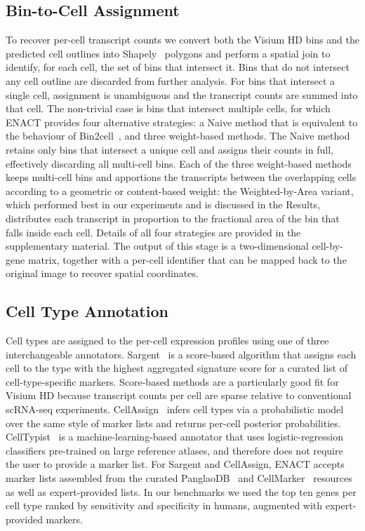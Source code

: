 \documentclass[11pt]{article}
\begin{document}
\subsection{Bin-to-Cell Assignment}

To recover per-cell transcript counts we convert both the Visium HD bins and the predicted cell outlines into Shapely~\cite{shapely2007gillies} polygons and perform a spatial join to identify, for each cell, the set of bins that intersect it. Bins that do not intersect any cell outline are discarded from further analysis. For bins that intersect a single cell, assignment is unambiguous and the transcript counts are summed into that cell. The non-trivial case is bins that intersect multiple cells, for which ENACT provides four alternative strategies: a Naive method that is equivalent to the behaviour of Bin2cell~\cite{polacco2024bin2cell}, and three weight-based methods. The Naive method retains only bins that intersect a unique cell and assigns their counts in full, effectively discarding all multi-cell bins. Each of the three weight-based methods keeps multi-cell bins and apportions the transcripts between the overlapping cells according to a geometric or content-based weight: the Weighted-by-Area variant, which performed best in our experiments and is discussed in the Results, distributes each transcript in proportion to the fractional area of the bin that falls inside each cell. Details of all four strategies are provided in the supplementary material. The output of this stage is a two-dimensional cell-by-gene matrix, together with a per-cell identifier that can be mapped back to the original image to recover spatial coordinates.

\subsection{Cell Type Annotation}

Cell types are assigned to the per-cell expression profiles using one of three interchangeable annotators. Sargent~\cite{nouri2024sargent} is a score-based algorithm that assigns each cell to the type with the highest aggregated signature score for a curated list of cell-type-specific markers. Score-based methods are a particularly good fit for Visium HD because transcript counts per cell are sparse relative to conventional scRNA-seq experiments. CellAssign~\cite{zhang2019probabilistic} infers cell types via a probabilistic model over the same style of marker lists and returns per-cell posterior probabilities. CellTypist~\cite{conde2022celltypist} is a machine-learning-based annotator that uses logistic-regression classifiers pre-trained on large reference atlases, and therefore does not require the user to provide a marker list. For Sargent and CellAssign, ENACT accepts marker lists assembled from the curated PanglaoDB~\cite{franzen2019panglaodb} and CellMarker~\cite{zhang2019cellmarker} resources as well as expert-provided lists. In our benchmarks we used the top ten genes per cell type ranked by sensitivity and specificity in humans, augmented with expert-provided markers.
\end{document}
